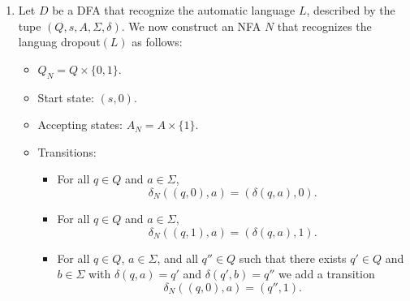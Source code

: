 \documentclass[12pt]{article}
\begin{document}
\begin{solution}
\begin{enumerate}
        $(\implies)$
        
        Assume $D'$ accepts $w$. Then $\delta^\star(q, w) \in A$ for some state $q$. But by construction of states and transitions we know that $q$ is a state of the DFA $D$ and there exists a string $x \in \Sigma^\star$ such that $\delta^\star(s,x) = q$. Then, 
        \[\delta^\star(s, xy)  = \delta^\star(q, y) \in A\] 

        So $xy \in L$ and $y \in $ suffix$(L)$. 
        
        
        $(\impliedby)$

        Assume $D$ accepts $xy$, then $y \in $ suffix$(L)$. Then $\delta^\star(s, xy) \in A$. Let $q = \delta^\star(s, x)$. Then $\delta^\star(q, y) \in A$. By construction we know that $q$ is a strating state in $D'$, and there exists a path $\delta'^\star(q,y) \in A'$.
        
        Hence, $y \in L(D')$ and $L(D') = \text{suffix}(L)$. 

        Note since we know that for every NFA there exists an equivalent DFA, suffix$(L)$ is automatic. 

        \newpage 
        \item Let $D$ be a DFA  that recognize the automatic language $L$, described by the tupe $ (Q, s, A, \Sigma, \delta)$. We now construct an NFA $N$ that recognizes the languag dropout$(L)$ as follows:
        \begin{itemize}
            \item $Q_N = Q \times \{0,1\}$.
            \item Start state: $(s,0)$.
            \item Accepting states: $A_N = A \times \{1\}$.
            \item Transitions:
            \begin{itemize}
                \item For all $q \in Q$ and $a \in \Sigma$,
                \[
                \delta_N((q,0), a) = (\delta(q,a),0).
                \]
                \item For all $q \in Q$ and $a \in \Sigma$,
                \[
                \delta_N((q,1), a) = (\delta(q,a),1).
                \]
                \item For all $q \in Q$, $a \in \Sigma$, and all $q'' \in Q$ such that there exists $q' \in Q$ and $b \in \Sigma$ with $\delta(q,a)=q'$ {and} $\delta(q',b)=q''$ we add a transition
                \[
                \delta_N((q,0), a) = (q'',1).
                \]
            \end{itemize}
        \end{itemize}


\end{enumerate}
\end{solution}
\end{document}
